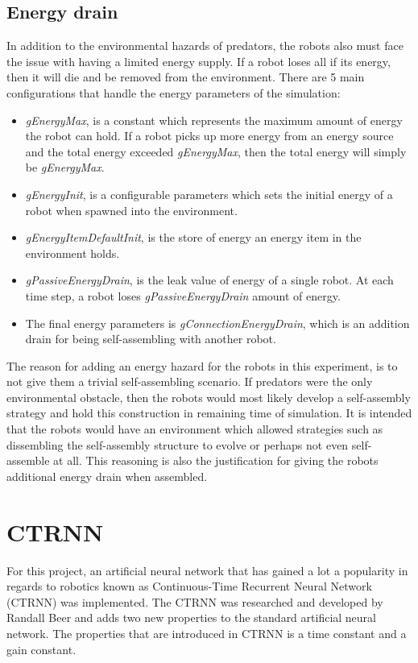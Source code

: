 \subsection{Energy drain}
In addition to the environmental hazards of predators, the robots also must face the issue with having a limited energy supply.
If a robot loses all if its energy, then it will die and be removed from the environment.
There are 5 main configurations that handle the energy parameters of the simulation:

\begin{itemize}

\item \emph{gEnergyMax}, is a constant which represents the maximum amount of energy the robot can hold.
If a robot picks up more energy from an energy source and the total energy exceeded \emph{gEnergyMax}, then the total energy will simply be \emph{gEnergyMax}.

\item \emph{gEnergyInit}, is a configurable parameters which sets the initial energy of a robot when spawned into the environment.

\item \emph{gEnergyItemDefaultInit}, is the store of energy an energy item in the environment holds.

\item \emph{gPassiveEnergyDrain}, is the leak value of energy of a single robot. At each time step, a robot loses \emph{gPassiveEnergyDrain} amount of energy.

\item The final energy parameters is \emph{gConnectionEnergyDrain}, which is an addition drain for being self-assembling with another robot.


\end{itemize}


The reason for adding an energy hazard for the robots in this experiment, is to not give them a trivial self-assembling scenario.
If predators were the only environmental obstacle, then the robots would most likely develop a self-assembly strategy and hold this construction in remaining time of simulation.
It is intended that the robots would have an environment which allowed strategies such as dissembling the self-assembly structure to evolve or perhaps not even self-assemble at all.
This reasoning is also the justification for giving the robots additional energy drain when assembled.

\section{CTRNN}
\label{sec:ctrnn}
For this project, an artificial neural network that has gained a lot a popularity in regards to robotics known as Continuous-Time Recurrent Neural Network (CTRNN) was implemented. 
The CTRNN was researched and developed by Randall Beer\cite{beer_dynamics_1997} and adds two new properties to the standard artificial neural network. 
The properties that are introduced in CTRNN is a time constant and a gain constant.

